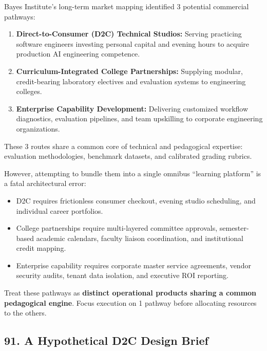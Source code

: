 Bayes Institute's long-term market mapping identified 3 potential commercial pathways:
\begin{enumerate}
    \item \textbf{Direct-to-Consumer (D2C) Technical Studios:} Serving practicing software engineers investing personal capital and evening hours to acquire production AI engineering competence.
    \item \textbf{Curriculum-Integrated College Partnerships:} Supplying modular, credit-bearing laboratory electives and evaluation systems to engineering colleges.
    \item \textbf{Enterprise Capability Development:} Delivering customized workflow diagnostics, evaluation pipelines, and team upskilling to corporate engineering organizations.
\end{enumerate}

These 3 routes share a common core of technical and pedagogical expertise: evaluation methodologies, benchmark datasets, and calibrated grading rubrics.

However, attempting to bundle them into a single omnibus ``learning platform'' is a fatal architectural error:
\begin{itemize}
    \item D2C requires frictionless consumer checkout, evening studio scheduling, and individual career portfolios.
    \item College partnerships require multi-layered committee approvals, semester-based academic calendars, faculty liaison coordination, and institutional credit mapping.
    \item Enterprise capability requires corporate master service agreements, vendor security audits, tenant data isolation, and executive ROI reporting.
\end{itemize}

Treat these pathways as \textbf{distinct operational products sharing a common pedagogical engine}. Focus execution on 1 pathway before allocating resources to the others.

\subsection*{91. A Hypothetical D2C Design Brief}

